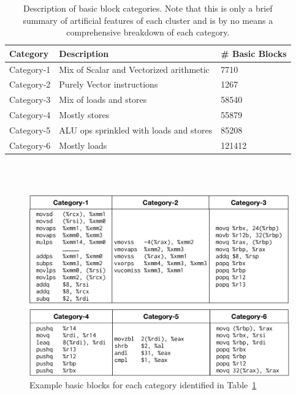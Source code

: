 \begin{table}
    \centering
\begin{tabular}{|p{}|p{}|p{}|} 
    \hline
    \textbf{Category} & \textbf{Description} & \textbf{\# Basic Blocks}\\
    \hline
    
    Category-1 & 
    Mix of Scalar and Vectorized arithmetic & 7710 
    \\
    \hline
    
    Category-2 &
    Purely Vector instructions & 1267
    \\
    \hline
    
    Category-3 &
    Mix of loads and stores & 58540 
    \\
    \hline
    
    Category-4 &
    Mostly stores & 55879 
    \\
    \hline
    
    Category-5 &
    ALU ops sprinkled with loads and stores & 85208 
    \\
    \hline
    
    Category-6 &
    Mostly loads & 121412
    \\
    \hline
\end{tabular}
\\
~\\
\caption{Description of basic block categories. Note that this is only a brief
summary of artificial features of each cluster and is by no means a comprehensive
breakdown of each category.}
\label{tab:categories}

\end{table}

\begin{figure}[th]
\begin{center}
\includegraphics[width=\columnwidth]{figures/examples.pdf}
\caption{Example basic blocks for each category identified in Table~\ref{tab:categories}}
\label{fig:examples}
\end{center}
\end{figure}


